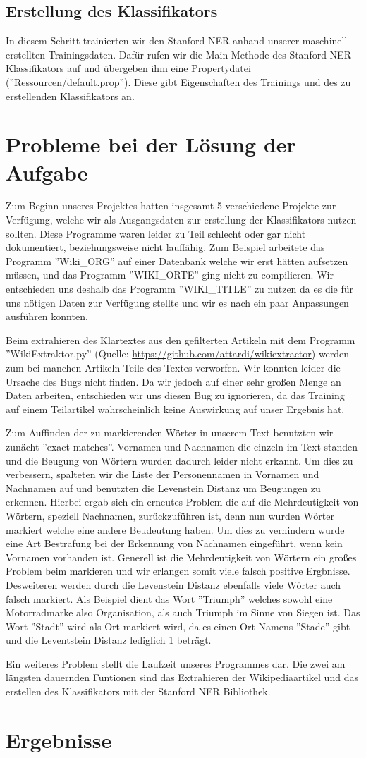 \documentclass[a4paper]{article}
\begin{document}
\subsection{Erstellung des Klassifikators}
In diesem Schritt trainierten wir den Stanford NER anhand unserer maschinell erstellten Trainingsdaten. Dafür rufen wir die Main Methode des Stanford NER Klassifikators auf und übergeben ihm eine Propertydatei (''Ressourcen/default.prop''). Diese gibt Eigenschaften des Trainings und des zu erstellenden Klassifikators an.

\section{Probleme bei der Lösung der Aufgabe}
Zum Beginn unseres Projektes hatten insgesamt 5 verschiedene Projekte zur Verfügung, welche wir als Ausgangsdaten zur erstellung der Klassifikators nutzen sollten. Diese Programme waren leider zu Teil schlecht oder gar nicht dokumentiert, beziehungsweise nicht lauffähig. Zum Beispiel arbeitete das Programm ''Wiki\_ORG'' auf einer Datenbank welche wir erst hätten aufsetzen müssen, und  das Programm ''WIKI\_ORTE'' ging nicht zu compilieren. Wir entschieden uns deshalb das Programm ''WIKI\_TITLE'' zu nutzen da es die für uns nötigen Daten zur Verfügung stellte und wir es nach ein paar Anpassungen ausführen konnten.

Beim extrahieren des Klartextes aus den gefilterten Artikeln mit dem Programm ''WikiExtraktor.py'' (Quelle: \url{https://github.com/attardi/wikiextractor}) werden zum bei manchen Artikeln Teile des Textes verworfen. Wir konnten leider die Ursache des Bugs nicht finden. Da wir jedoch auf einer sehr großen Menge an Daten arbeiten, entschieden wir uns diesen Bug zu ignorieren, da das Training auf einem Teilartikel wahrscheinlich keine Auswirkung auf unser Ergebnis hat.

Zum Auffinden der zu markierenden Wörter in unserem Text benutzten wir zunächt ''exact-matches''. Vornamen und Nachnamen die einzeln im Text standen und die Beugung von Wörtern wurden dadurch leider nicht erkannt. Um dies zu verbessern, spalteten wir die Liste der Personennamen in Vornamen und Nachnamen auf und benutzten die Levenstein Distanz um Beugungen zu erkennen. Hierbei ergab sich ein erneutes Problem die auf die Mehrdeutigkeit von Wörtern, speziell Nachnamen, zurückzuführen ist, denn nun wurden Wörter markiert welche eine andere Beudeutung haben. Um dies zu verhindern wurde eine Art Bestrafung bei der Erkennung von Nachnamen eingeführt, wenn kein Vornamen vorhanden ist. Generell ist die Mehrdeutigkeit von Wörtern ein großes Problem beim markieren und wir erlangen somit viele falsch positive Ergbnisse. Desweiteren werden durch die Levenstein Distanz ebenfalls viele Wörter auch falsch markiert. Als Beispiel dient das Wort ''Triumph'' welches sowohl eine Motorradmarke also Organisation, als auch Triumph im Sinne von Siegen ist. Das Wort ''Stadt'' wird als Ort markiert wird, da es einen Ort Namens ''Stade'' gibt und die Leventstein Distanz lediglich 1 beträgt.

Ein weiteres Problem stellt die Laufzeit unseres Programmes dar. Die zwei am längsten dauernden Funtionen sind das Extrahieren der Wikipediaartikel und das erstellen des Klassifikators mit der Stanford NER Bibliothek.
\section{Ergebnisse}
\end{document}
